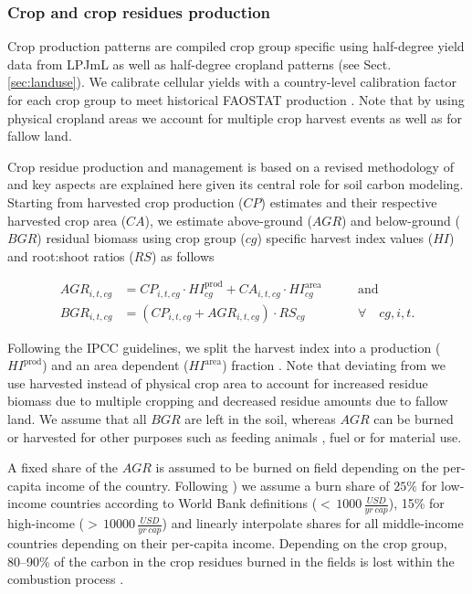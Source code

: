 \documentclass[gc, manuscript]{copernicus}
\begin{document}
\hypertarget{sec:residues}{%
\subsubsection{Crop and crop residues production}\label{sec:residues}}

Crop production patterns are compiled crop group specific using half-degree yield data from LPJmL \citep{schaphoff_lpjml4_2018} as well as half-degree cropland patterns (see Sect. \ref{sec:landuse}). We calibrate cellular yields with a country-level calibration factor for each crop group to meet historical FAOSTAT production \citep{faostat_faostat_2016}. Note that by using physical cropland areas we account for multiple crop harvest events as well as for fallow land.

Crop residue production and management is based on a revised methodology of \citep{bodirsky_n2o_2012} and key aspects are explained here given its central role for soil carbon modeling. Starting from harvested crop production (\(CP\)) estimates and their respective harvested crop area (\(CA\)), we estimate above-ground (\(AGR\)) and below-ground (\(BGR\)) residual biomass using crop group (\(cg\)) specific harvest index values (\(HI\)) and root:shoot ratios (\(RS\)) as follows

\begin{equation}
\begin{aligned}
AGR_{i,t,cg} & = CP_{i,t,cg} \cdot HI^{\mathrm{prod}}_{cg} + CA_{i,t,cg} \cdot HI^{\mathrm{area}}_{cg}
\qquad & \textrm{and} \\
BGR_{i,t,cg} & = (CP_{i,t,cg} + AGR_{i,t,cg}) \cdot RS_{cg} \qquad                                            & \forall\quad cg, i, t.
\label{eq:resbiomass}
\end{aligned}
\end{equation}

Following the IPCC guidelines, we split the harvest index into a production (\(HI^{\mathrm{prod}}\)) and an area dependent (\(HI^{\mathrm{area}}\)) fraction \citep{eggleston_ipcc_2006}. Note that deviating from \citep{bodirsky_n2o_2012} we use harvested instead of physical crop area to account for increased residue biomass due to multiple cropping and decreased residue amounts due to fallow land. We assume that all \(BGR\) are left in the soil, whereas \(AGR\) can be burned or harvested for other purposes such as feeding animals \citep{weindl_livestock_2017}, fuel or for material use.

A fixed share of the \(AGR\) is assumed to be burned on field depending on the per-capita income of the country. Following \citep{smil_nitrogen_1999}) we assume a burn share of \(25\%\) for low-income countries according to World Bank definitions (\(<\,1000\,\tfrac{USD}{yr\,cap}\)), 15\% for high-income (\(>\,10000\,\tfrac{USD}{yr\,cap}\)) and linearly interpolate shares for all middle-income countries depending on their per-capita income. Depending on the crop group, 80--90\% of the carbon in the crop residues burned in the fields is lost within the combustion process \citep{eggleston_ipcc_2006}.
\end{document}
